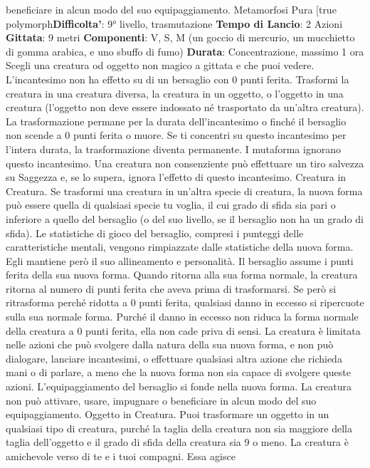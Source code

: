 \begin{multicols}{2}
beneficiare in alcun modo del suo equipaggiamento.
Metamorfosi Pura
[true polymorph\textbf{Difficolta'}:
9° livello, trasmutazione
\textbf{Tempo di Lancio}: 2 Azioni
\textbf{Gittata}: 9 metri
\textbf{Componenti}: V, S, M (un goccio di mercurio, un
mucchietto di gomma arabica, e uno sbuffo di fumo)
\textbf{Durata}: Concentrazione, massimo 1 ora
Scegli una creatura od oggetto non magico a gittata e
che puoi vedere. L’incantesimo non ha effetto su di un
bersaglio con 0 punti ferita. Trasformi la creatura in una
creatura diversa, la creatura in un oggetto, o l’oggetto in
una creatura (l’oggetto non deve essere indossato né
trasportato da un’altra creatura). La trasformazione
permane per la durata dell’incantesimo o finché il
bersaglio non scende a 0 punti ferita o muore. Se ti
concentri su questo incantesimo per l’intera durata, la
trasformazione diventa permanente.
I mutaforma ignorano questo incantesimo. Una creatura
non consenziente può effettuare un tiro salvezza su
Saggezza e, se lo supera, ignora l’effetto di questo
incantesimo.
Creatura in Creatura. Se trasformi una creatura in
un’altra specie di creatura, la nuova forma può essere
quella di qualsiasi specie tu voglia, il cui grado di sfida
sia pari o inferiore a quello del bersaglio (o del suo
livello, se il bersaglio non ha un grado di sfida). Le
statistiche di gioco del bersaglio, compresi i punteggi
delle caratteristiche mentali, vengono rimpiazzate dalle
statistiche della nuova forma. Egli mantiene però il suo
allineamento e personalità.
Il bersaglio assume i punti ferita della sua nuova forma.
Quando ritorna alla sua forma normale, la creatura
ritorna al numero di punti ferita che aveva prima di
trasformarsi. Se però si ritrasforma perché ridotta a 0
punti ferita, qualsiasi danno in eccesso si ripercuote
sulla sua normale forma. Purché il danno in eccesso
non riduca la forma normale della creatura a 0 punti
ferita, ella non cade priva di sensi.
La creatura è limitata nelle azioni che può svolgere
dalla natura della sua nuova forma, e non può
dialogare, lanciare incantesimi, o effettuare qualsiasi
altra azione che richieda mani o di parlare, a meno che
la nuova forma non sia capace di svolgere queste
azioni.
L’equipaggiamento del bersaglio si fonde nella nuova
forma. La creatura non può attivare, usare, impugnare o
beneficiare in alcun modo del suo equipaggiamento.
Oggetto in Creatura. Puoi trasformare un oggetto in un
qualsiasi tipo di creatura, purché la taglia della creatura
non sia maggiore della taglia dell’oggetto e il grado di
sfida della creatura sia 9 o meno. La creatura è
amichevole verso di te e i tuoi compagni. Essa agisce

\end{multicols}
